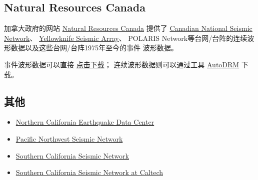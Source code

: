 \subsection{Natural Resources Canada}
\label{subsec:nrcan}
加拿大政府的网站 \href{http://www.nrcan.gc.ca/home}{Natural Resources Canada}
提供了
\href{http://www.earthquakescanada.nrcan.gc.ca/stndon/CNSN-RNSC/index-eng.php}{Canadian National Seismic Network}、
\href{http://can-ndc.nrcan.gc.ca/yka/index-en.php}{Yellowknife Seismic Array}、
POLARIS Network等台网/台阵的连续波形数据以及这些台网/台阵1975年至今的事件
波形数据。

事件波形数据可以直接 \href{http://www.earthquakescanada.nrcan.gc.ca/stndon/NWFA-ANFO/eve/index-eng.php}{点击下载}；
连续波形数据则可以通过工具
\href{http://www.earthquakescanada.nrcan.gc.ca/stndon/AutoDRM/index-eng.php}{AutoDRM} 下载。

\subsection{其他}
\begin{itemize}
\item \href{http://www.ncedc.org/}{Northern California Earthquake Data Center}
\item \href{http://pnsn.org/}{Pacific Northwest Seismic Network}
\item \href{http://www.scsn.org/}{Southern California Seismic Network}
\item \href{http://scedc.caltech.edu/}{Southern California Seismic Network at Caltech}
\end{itemize}
